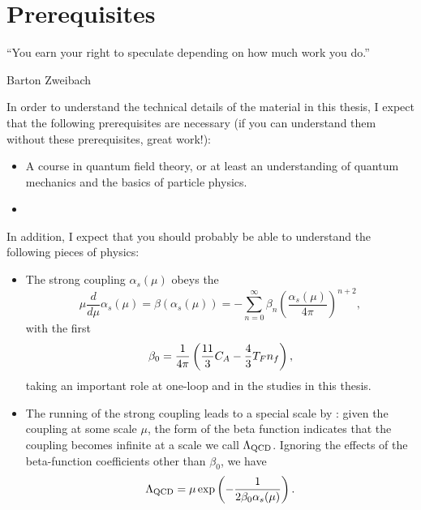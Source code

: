 \section*{Prerequisites}

\epigraph{``You earn your right to speculate depending on how much work you do.''}{Barton Zweibach}

In order to understand the technical details of the material in this thesis, I expect that the following prerequisites are necessary (if you can understand them without these prerequisites, great work!):
\begin{itemize}
    \item
        A course in quantum field theory, or at least an understanding of quantum mechanics and the basics of particle physics.

    \item

\end{itemize}

In addition, I expect that you should probably be able to understand the following pieces of physics:
\begin{itemize}
    \item
        The strong coupling \(\alpha_s(\mu)\) obeys the 
        \begin{equation}
        \mu \frac{d}{d\mu} \alpha_s(\mu) = \beta(\alpha_s(\mu))
        =
        - \sum_{n=0}^\infty \beta_n
        {\left(\frac{\alpha_s(\mu)}{4\pi}\right)}^{n+2},
        \end{equation}
         with the first 
        \begin{equation}
            \beta_0
            =
            \frac{1}{4\pi}\left(
                \frac{11}{3} C_A - \frac{4}{3} T_F n_f
            \right)
            ,
        \end{equation}
        taking an important role at one-loop and in the studies in this thesis.

    \item
        The running of the strong coupling leads to a special scale by :
        given the coupling at some scale \(\mu\), the form of the beta function indicates that the coupling becomes infinite at a scale we call \(\Lambda_{\mathrm{QCD}}\).
        Ignoring the effects of the beta-function coefficients other than \(\beta_0\), we have
        \begin{equation}
            \Lambda_{\mathrm{QCD}} = \mu \exp\left(-\frac{1}{2\beta_0 \alpha_s(\mu)}\right).
        \end{equation}
\end{itemize}
